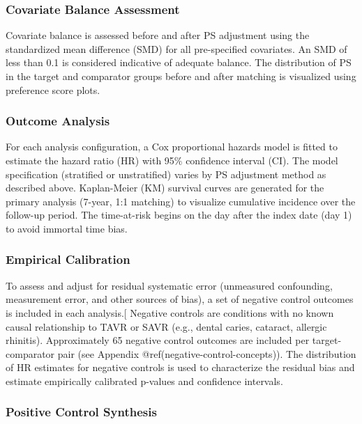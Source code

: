 \documentclass[
  12pt,
]{article}
\begin{document}
\subsubsection{Covariate Balance
Assessment}\label{covariate-balance-assessment}

Covariate balance is assessed before and after PS adjustment using the
standardized mean difference (SMD) for all pre-specified covariates. An
SMD of less than 0.1 is considered indicative of adequate balance. The
distribution of PS in the target and comparator groups before and after
matching is visualized using preference score plots.

\subsubsection{Outcome Analysis}\label{outcome-analysis}

For each analysis configuration, a Cox proportional hazards model is
fitted to estimate the hazard ratio (HR) with 95\% confidence interval
(CI). The model specification (stratified or unstratified) varies by PS
adjustment method as described above. Kaplan-Meier (KM) survival curves
are generated for the primary analysis (7-year, 1:1 matching) to
visualize cumulative incidence over the follow-up period. The
time-at-risk begins on the day after the index date (day 1) to avoid
immortal time bias.

\subsubsection{Empirical Calibration}\label{empirical-calibration}

To assess and adjust for residual systematic error (unmeasured
confounding, measurement error, and other sources of bias), a set of
negative control outcomes is included in each
analysis.{[}\citeproc{ref-Schuemie2018-pnas}{14}{]} Negative controls
are conditions with no known causal relationship to TAVR or SAVR (e.g.,
dental caries, cataract, allergic rhinitis). Approximately 65 negative
control outcomes are included per target-comparator pair (see Appendix
@ref(negative-control-concepts)). The distribution of HR estimates for
negative controls is used to characterize the residual bias and estimate
empirically calibrated p-values and confidence intervals.

\subsubsection{Positive Control
Synthesis}\label{positive-control-synthesis}
\end{document}
